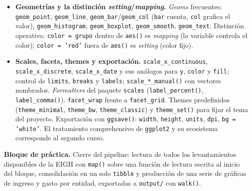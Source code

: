 \documentclass[11pt,letterpaper]{article}
\newcommand{\orange}[1]{{\color{redorange}#1}}
\newcommand{\practica}[1]{%
  \medskip\noindent\textbf{\orange{Bloque de práctica.}} #1\par%
}
\begin{document}
\begin{itemize}[leftmargin=*, itemsep=2pt]
\begin{itemize}[leftmargin=*, itemsep=1pt, label=$\circ$]
        \item \textbf{Position adjustments:} \texttt{stack}, \texttt{dodge}, \texttt{jitter}, \texttt{fill}.
        \item \textbf{Scales} (\texttt{scale\_*}): traducción de los \textit{aesthetics} a valores visuales.
        \item \textbf{Facets} (\texttt{facet\_*}): partición de la gráfica en sub-paneles.
        \item \textbf{Theme:} tipografía, fondos, ejes, leyendas y demás elementos no asociados a datos.
    \end{itemize}
    \item \textbf{Geometrías y la distinción \textit{setting}/\textit{mapping}.} \textit{Geoms} frecuentes: \texttt{geom\_point}, \texttt{geom\_line}, \texttt{geom\_bar}/\texttt{geom\_col} (\texttt{bar} cuenta, \texttt{col} grafica el valor), \texttt{geom\_histogram}, \texttt{geom\_boxplot}, \texttt{geom\_smooth}, \texttt{geom\_text}. Distinción operativa: \texttt{color = grupo} dentro de \texttt{aes()} es \textit{mapping} (la variable controla el color); \texttt{color = 'red'} fuera de \texttt{aes()} es \textit{setting} (color fijo).
    \item \textbf{Scales, facets, themes y exportación.} \texttt{scale\_x\_continuous}, \texttt{scale\_x\_discrete}, \texttt{scale\_x\_date} y sus análogos para \texttt{y}, \texttt{color} y \texttt{fill}; control de \texttt{limits}, \texttt{breaks} y \texttt{labels}; \texttt{scale\_*\_manual()} con vectores nombrados. \textit{Formatters} del paquete \texttt{scales} (\texttt{label\_percent()}, \texttt{label\_comma()}). \texttt{facet\_wrap} frente a \texttt{facet\_grid}. Themes predefinidos (\texttt{theme\_minimal}, \texttt{theme\_bw}, \texttt{theme\_classic}) y \texttt{theme\_set()} para fijar el tema del proyecto. Exportación con \texttt{ggsave()}: \texttt{width}, \texttt{height}, \texttt{units}, \texttt{dpi}, \texttt{bg = 'white'}. El tratamiento comprehensivo de \texttt{ggplot2} y su ecosistema corresponde al segundo curso.
\end{itemize}

\practica{Cierre del pipeline: lectura de todos los levantamientos disponibles de la EIGH con \texttt{map()} sobre una función de lectura escrita al inicio del bloque, consolidación en un solo \texttt{tibble} y producción de una serie de gráficas de ingreso y gasto por entidad, exportadas a \texttt{output/} con \texttt{walk()}.}
\end{document}
